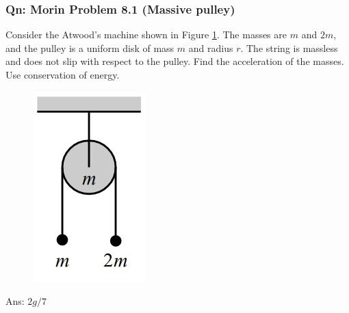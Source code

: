 \documentclass{article}
\begin{document}
\subsubsection{Qn: Morin Problem 8.1 (Massive pulley)}
Consider the Atwood's machine shown in Figure \ref{fig:morin8.1}. The masses are $m$ and $2 m$, and the pulley is a uniform disk of mass $m$ and radius $r$. The string is massless and does not slip with respect to the pulley. Find the acceleration of the masses. Use conservation of energy. \\
\begin{figure}
\includegraphics[width=1.0\linewidth]{images/morin8.1.png}
\label{fig:morin8.1}
\end{figure}
Ans: $2g/7$
\end{document}
